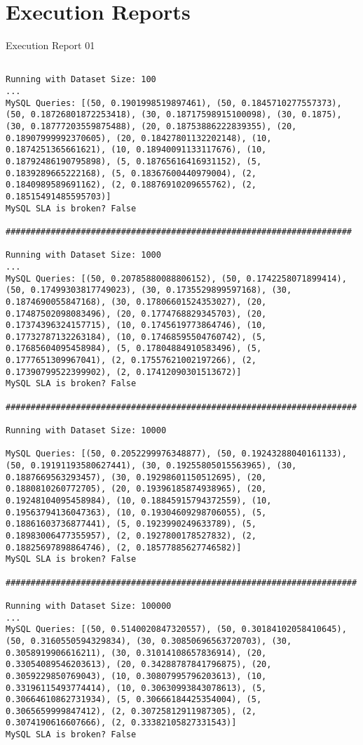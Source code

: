 \apendice
\chapter{Execution Reports}
\label{executionreport01}

Execution Report 01 
\begin{lstlisting}

Running with Dataset Size: 100
...
MySQL Queries: [(50, 0.1901998519897461), (50, 0.1845710277557373), (50, 0.18726801872253418), (30, 0.18717598915100098), (30, 0.1875), (30, 0.18777203559875488), (20, 0.18753886222839355), (20, 0.18907999992370605), (20, 0.18427801132202148), (10, 0.1874251365661621), (10, 0.18940091133117676), (10, 0.18792486190795898), (5, 0.18765616416931152), (5, 0.1839289665222168), (5, 0.18367600440979004), (2, 0.1840989589691162), (2, 0.18876910209655762), (2, 0.18515491485595703)]
MySQL SLA is broken? False

#####################################################################

Running with Dataset Size: 1000
...
MySQL Queries: [(50, 0.20785880088806152), (50, 0.1742258071899414), (50, 0.17499303817749023), (30, 0.1735529899597168), (30, 0.1874690055847168), (30, 0.17806601524353027), (20, 0.17487502098083496), (20, 0.1774768829345703), (20, 0.17374396324157715), (10, 0.1745619773864746), (10, 0.17732787132263184), (10, 0.17468595504760742), (5, 0.17685604095458984), (5, 0.17804884910583496), (5, 0.1777651309967041), (2, 0.17557621002197266), (2, 0.17390799522399902), (2, 0.17412090301513672)]
MySQL SLA is broken? False

######################################################################

Running with Dataset Size: 10000

MySQL Queries: [(50, 0.2052299976348877), (50, 0.19243288040161133), (50, 0.19191193580627441), (30, 0.19255805015563965), (30, 0.1887669563293457), (30, 0.19298601150512695), (20, 0.1880810260772705), (20, 0.19396185874938965), (20, 0.19248104095458984), (10, 0.18845915794372559), (10, 0.19563794136047363), (10, 0.19304609298706055), (5, 0.18861603736877441), (5, 0.1923990249633789), (5, 0.18983006477355957), (2, 0.1927800178527832), (2, 0.18825697898864746), (2, 0.18577885627746582)]
MySQL SLA is broken? False

######################################################################

Running with Dataset Size: 100000
...
MySQL Queries: [(50, 0.5140020847320557), (50, 0.30184102058410645), (50, 0.3160550594329834), (30, 0.30850696563720703), (30, 0.3058919906616211), (30, 0.31014108657836914), (20, 0.33054089546203613), (20, 0.34288787841796875), (20, 0.3059229850769043), (10, 0.30807995796203613), (10, 0.33196115493774414), (10, 0.30630993843078613), (5, 0.30664610862731934), (5, 0.30666184425354004), (5, 0.3065659999847412), (2, 0.30725812911987305), (2, 0.3074190616607666), (2, 0.33382105827331543)]
MySQL SLA is broken? False


\end{lstlisting}

